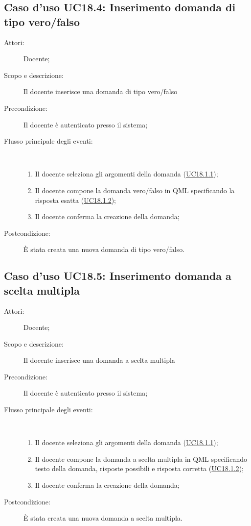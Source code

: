 \subsection{Caso d'uso UC18.4: Inserimento domanda di tipo vero/falso}\begin{description}
\item[Attori:] Docente;
\item[Scopo e descrizione:] Il docente inserisce una domanda di tipo vero/falso
      \item[Precondizione:] Il docente è autenticato presso il sistema;

        \item[Flusso principale degli eventi:] \ 
 \begin{enumerate}
          \item Il docente seleziona gli argomenti della domanda (\hyperlink{UC18.1.1}{UC18.1.1});
          \item Il docente compone la domanda vero/falso in QML specificando la risposta esatta (\hyperlink{UC18.1.2}{UC18.1.2});
          \item Il docente conferma la creazione della domanda;

      \end{enumerate}
    \item[Postcondizione:] È stata creata una nuova domanda di tipo vero/falso.
  \end{description}
\hypertarget{UC18.5}{}
\subsection{Caso d'uso UC18.5: Inserimento domanda a scelta multipla}\begin{description}
\item[Attori:] Docente;
\item[Scopo e descrizione:] Il docente inserisce una domanda a scelta multipla
      \item[Precondizione:] Il docente è autenticato presso il sistema;

        \item[Flusso principale degli eventi:] \ 
 \begin{enumerate}
          \item Il docente seleziona gli argomenti della domanda (\hyperlink{UC18.1.1}{UC18.1.1});
          \item Il docente compone la domanda a scelta multipla in QML specificando testo della domanda, risposte possibili e risposta corretta (\hyperlink{UC18.1.2}{UC18.1.2});
          \item Il docente conferma la creazione della domanda;

      \end{enumerate}
    \item[Postcondizione:] È stata creata una nuova domanda a scelta multipla.
  \end{description}
\hypertarget{UC18.6}{}
